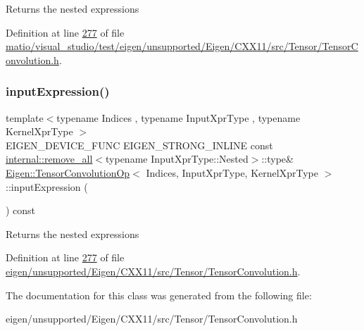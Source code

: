 \begin{DoxyReturn}{Returns}
the nested expressions 
\end{DoxyReturn}


Definition at line \hyperlink{matio_2visual__studio_2test_2eigen_2unsupported_2_eigen_2_c_x_x11_2src_2_tensor_2_tensor_convolution_8h_source_l00277}{277} of file \hyperlink{matio_2visual__studio_2test_2eigen_2unsupported_2_eigen_2_c_x_x11_2src_2_tensor_2_tensor_convolution_8h_source}{matio/visual\+\_\+studio/test/eigen/unsupported/\+Eigen/\+C\+X\+X11/src/\+Tensor/\+Tensor\+Convolution.\+h}.

\mbox{\label{class_eigen_1_1_tensor_convolution_op_a57097fbe6e0a033d587e98654f0bd664}} 
\subsubsection{\texorpdfstring{input\+Expression()}{inputExpression()}\hspace{0.1cm}{\footnotesize\ttfamily [2/2]}}
{\footnotesize\ttfamily template$<$typename Indices , typename Input\+Xpr\+Type , typename Kernel\+Xpr\+Type $>$ \\
E\+I\+G\+E\+N\+\_\+\+D\+E\+V\+I\+C\+E\+\_\+\+F\+U\+NC E\+I\+G\+E\+N\+\_\+\+S\+T\+R\+O\+N\+G\+\_\+\+I\+N\+L\+I\+NE const \hyperlink{struct_eigen_1_1internal_1_1remove__all}{internal\+::remove\+\_\+all}$<$typename Input\+Xpr\+Type\+::\+Nested$>$\+::type\& \hyperlink{class_eigen_1_1_tensor_convolution_op}{Eigen\+::\+Tensor\+Convolution\+Op}$<$ Indices, Input\+Xpr\+Type, Kernel\+Xpr\+Type $>$\+::input\+Expression (\begin{DoxyParamCaption}{ }\end{DoxyParamCaption}) const\hspace{0.3cm}{\ttfamily [inline]}}

\begin{DoxyReturn}{Returns}
the nested expressions 
\end{DoxyReturn}


Definition at line \hyperlink{eigen_2unsupported_2_eigen_2_c_x_x11_2src_2_tensor_2_tensor_convolution_8h_source_l00277}{277} of file \hyperlink{eigen_2unsupported_2_eigen_2_c_x_x11_2src_2_tensor_2_tensor_convolution_8h_source}{eigen/unsupported/\+Eigen/\+C\+X\+X11/src/\+Tensor/\+Tensor\+Convolution.\+h}.



The documentation for this class was generated from the following file\+:\begin{DoxyCompactItemize}
\item 
eigen/unsupported/\+Eigen/\+C\+X\+X11/src/\+Tensor/\+Tensor\+Convolution.\+h\end{DoxyCompactItemize}
